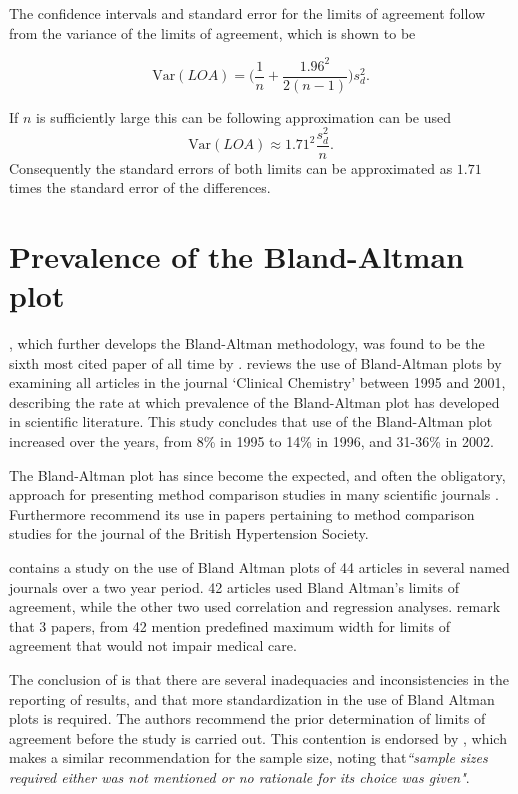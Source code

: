\documentclass[12pt, a4paper]{report}
\theoremstyle{plain}
\theoremstyle{definition}
\theoremstyle{remark}
\begin{document}
	The confidence intervals and standard error for the limits of agreement follow from the variance of the limits of agreement, which is shown to be
	
	\[
	\mbox{Var}(LOA) = \bigg(\frac{1}{n}+\frac{1.96^{2}}{2(n-1)}\bigg)s_{d}^{2}.
	\]
	
	If $n$ is sufficiently large this can be following approximation can be used
	\[
	\mbox{Var}(LOA) \approx 1.71^{2}\frac{s_{d}^{2}}{n}.
	\]
	Consequently the standard errors of both limits can be approximated as $1.71$ times the standard error of the differences.
	
	
	\section{Prevalence of the Bland-Altman plot}
	
	\citet*{BA86}, which further develops the Bland-Altman methodology,
	was found to be the sixth most cited paper of all time by \citet{BAcite}. \cite{Dewitte} reviews the use of Bland-Altman plots by examining all articles in the journal `Clinical Chemistry' between 1995 and 2001, describing the rate at which
	prevalence of the Bland-Altman plot has developed in scientific
	literature. This study concludes that use of the Bland-Altman plot increased over the years, from 8\% in 1995 to
	14\% in 1996, and 31-36\% in 2002.
	
	The Bland-Altman plot has since become the expected, and often the obligatory, approach for presenting method comparison
	studies in many scientific journals \citep{hollis}. Furthermore \citet{BritHypSoc} recommend its use in papers pertaining to
	method comparison studies for the journal of the British Hypertension Society.
	
	
	\citet{mantha} contains a study on the use of Bland Altman plots of 44 articles in several named journals over a two year period. 42 articles used Bland Altman's limits of agreement, while the other two used correlation and regression analyses. \citet{mantha} remark that 3 papers, from 42 mention predefined maximum width for limits of agreement that would not impair medical care.
	
	The conclusion of \citet{mantha} is that there are several inadequacies and inconsistencies in the reporting of results, and
	that more standardization in the use of Bland Altman plots is required. The authors recommend the prior determination of limits of agreement before the study is carried out. This contention is endorsed by \citet{lin}, which makes a similar recommendation for the sample size, noting that\emph{``sample sizes required either was 	not mentioned or no rationale for its choice was given"}.
	
\end{document}
